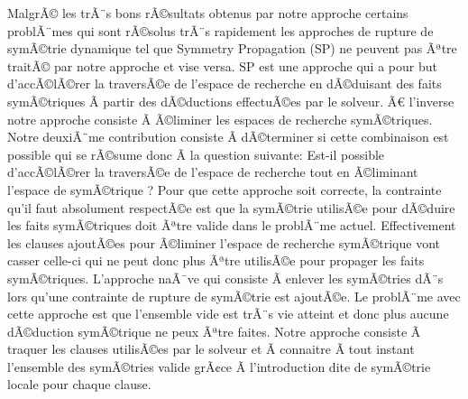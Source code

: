 MalgrÃ© les trÃ¨s bons rÃ©sultats obtenus par notre approche certains problÃ¨mes qui sont rÃ©solus trÃ¨s 
rapidement les approches de rupture de symÃ©trie dynamique tel que  Symmetry Propagation (SP) ne peuvent pas Ãªtre traitÃ© par notre approche et vise versa.
SP est une approche qui a pour but d'accÃ©lÃ©rer la traversÃ©e de l'espace de recherche en dÃ©duisant des faits symÃ©triques Ã  partir des dÃ©ductions effectuÃ©es par le solveur.
 Ã€ l'inverse notre approche consiste Ã  Ã©liminer les espaces de recherche 
symÃ©triques. %
Notre deuxiÃ¨me contribution consiste Ã  dÃ©terminer si cette combinaison est possible qui se rÃ©sume donc Ã  la question suivante:
Est-il possible d'accÃ©lÃ©rer la traversÃ©e de l'espace de recherche tout en Ã©liminant l'espace de symÃ©trique ?
Pour que cette approche soit correcte, la contrainte qu'il faut absolument respectÃ©e est que la symÃ©trie utilisÃ©e pour dÃ©duire les
faits symÃ©triques doit Ãªtre valide dans le problÃ¨me actuel. Effectivement les clauses ajoutÃ©es pour Ã©liminer l'espace de recherche
symÃ©trique vont casser celle-ci qui ne peut donc plus Ãªtre utilisÃ©e pour propager les faits symÃ©triques.
L'approche naÃ¯ve qui consiste Ã  enlever les symÃ©tries dÃ¨s lors qu'une contrainte de rupture de symÃ©trie est ajoutÃ©e. Le problÃ¨me avec cette approche est que l'ensemble vide est trÃ¨s vie atteint et donc plus aucune dÃ©duction symÃ©trique ne peux Ãªtre faites. Notre approche consiste Ã  traquer les clauses utilisÃ©es par le solveur et Ã  connaitre Ã  tout instant l'ensemble des symÃ©tries valide grÃ¢ce Ã  l'introduction dite de symÃ©trie locale pour chaque clause.
\begin{table}[!htbp]\footnotesize
 \centering
 \caption{Comparaison des approches sur les instances SAT.}
 \label{tab:satfr}
\end{table}%

